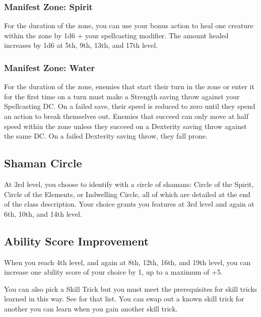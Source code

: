 \subsubsection{Manifest Zone: Spirit}
For the duration of the zone, you can use your bonus action to heal one creature within the zone by 1d6 + your spellcasting modifier. The amount healed increases by 1d6 at 5th, 9th, 13th, and 17th level.
\subsubsection{Manifest Zone: Water}
For the duration of the zone, enemies that start their turn in the zone or enter it for the first time on a turn must make a Strength saving throw against your Spellcasting DC. On a failed save, their speed is reduced to zero until they spend an action to break themselves out. Enemies that succeed can only move at half speed within the zone unless they succeed on a Dexterity saving throw against the same DC. On a failed Dexterity saving throw, they fall prone.

\subsection{Shaman Circle}

At 3rd level, you choose to identify with a circle of shamans: Circle of the Spirit, Circle of the Elements, or Indwelling Circle, all of which are detailed at the end of the class description. Your choice grants you features at 3rd level and again at 6th, 10th, and 14th level.

\subsection{Ability Score Improvement}

When you reach 4th level, and again at 8th, 12th, 16th, and 19th level, you can increase one ability score of your choice by 1, up to a maximum of +5.

You can also pick a Skill Trick but you must meet the prerequisites for skill tricks learned in this way. See  for that list. You can swap out a known skill trick for another you can learn when you gain another skill trick.

